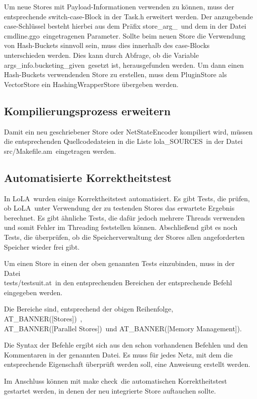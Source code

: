 \documentclass[12pt,a4paper,titlepage]{scrartcl}
\renewcommand \( {\left (}
\renewcommand \) {\right )}
\renewcommand \[ {\left [}
\renewcommand \] {\right ]}
\newcommand \Flqq {\flqq\ }
\newcommand{\lola}{\frqq LoLA\Flqq}
\begin{document}
Um neue Stores mit Payload-Informationen verwenden zu können, muss der entsprechende switch-case-Block in der Task.h erweitert werden. Der anzugebende case-Schlüssel besteht hierbei aus dem Präfix \frqq store\_arg\_\Flqq und dem in der Datei \frqq cmdline.ggo\Flqq eingetragenen Parameter. Sollte beim neuen Store die Verwendung von Hash-Buckets sinnvoll sein, muss dies innerhalb des case-Blocks unterschieden werden. Dies kann durch Abfrage, ob die Variable \frqq args\_info.bucketing\_given\Flqq gesetzt ist, herausgefunden werden. Um dann einen Hash-Buckets verwendenden Store zu erstellen, muss dem PluginStore als VectorStore ein HashingWrapperStore übergeben werden.


\subsection{Kompilierungsprozess erweitern}
Damit ein neu geschriebener Store oder NetStateEncoder kompiliert wird, müssen die entsprechenden Quellcodedateien in die Liste \frqq lola\_SOURCES\Flqq in der Datei \frqq src/Makefile.am\Flqq eingetragen werden.

\subsection{Automatisierte Korrektheitstest}
In \lola wurden einige Korrektheitstest automatisiert. Es gibt Tests, die prüfen, ob \lola unter Verwendung der zu testenden Stores das erwartete Ergebnis berechnet. Es gibt ähnliche Tests, die dafür jedoch mehrere Threads verwenden und somit Fehler im Threading feststellen können. Abschließend gibt es noch Tests, die überprüfen, ob die Speicherverwaltung der Stores allen angeforderten Speicher wieder frei gibt.

Um einen Store in einen der oben genannten Tests einzubinden, muss in der Datei
\\\frqq tests/testsuit.at\Flqq in den entsprechenden Bereichen der entsprechende Befehl eingegeben werden.

Die Bereiche sind, entsprechend der obigen Reihenfolge, \frqq AT\_BANNER([Stores])\Flqq,\\\frqq AT\_BANNER([Parallel Stores])\Flqq und \frqq AT\_BANNER([Memory Management])\flqq.

Die Syntax der Befehle ergibt sich aus den schon vorhandenen Befehlen und den Kommentaren in der genannten Datei. Es muss für jedes Netz, mit dem die entsprechende Eigenschaft überprüft werden soll, eine Anweisung erstellt werden.

Im Anschluss können mit \frqq make check\Flqq die automatischen Korrektheitstest gestartet werden, in denen der neu integrierte Store auftauchen sollte.
\end{document}
